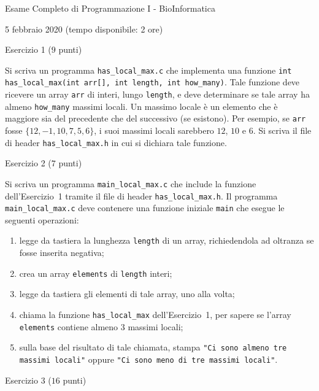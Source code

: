 \documentclass[12pt]{article}
\begin{document}
\begin{center}{\LARGE Esame Completo di Programmazione I - BioInformatica}\\
\vspace*{-2ex}
\begin{center}
  \large 5 febbraio 2020 (tempo disponibile: 2 ore)
\end{center}
\end{center}

\vspace*{1ex}
\begin{center}{\Large Esercizio 1} ($9$ punti)
\end{center}
Si scriva un programma \texttt{has\_local\_max.c} che implementa una funzione \texttt{int has\_local\_max(int arr[], int length, int how\_many)}. Tale funzione deve ricevere un array \texttt{arr} di interi, lungo \texttt{length}, e deve determinare se tale array ha almeno \texttt{how\_many} massimi locali. Un massimo locale \`e un elemento che \`e maggiore sia del precedente che del successivo (se esistono). Per esempio, se \texttt{arr} fosse $\{12,-1,10,7,5,6\}$, i suoi massimi locali sarebbero $12$, $10$ e $6$. Si scriva il file di header \texttt{has\_local\_max.h} in cui si dichiara tale funzione.

\vspace*{1ex}
\begin{center}{\Large Esercizio 2} ($7$ punti)\end{center}
%
Si scriva un programma \texttt{main\_local\_max.c} che include la funzione dell'Esercizio~1 tramite
il file di header \texttt{has\_local\_max.h}.
Il programma \texttt{main\_local\_max.c} deve contenere una funzione iniziale \texttt{main} che esegue
le seguenti operazioni:
\begin{enumerate}
\item legge da tastiera la lunghezza \texttt{length} di un array, richiedendola ad oltranza se fosse inserita negativa;
\item crea un array \texttt{elements} di \texttt{length} interi;
\item legge da tastiera gli elementi di tale array, uno alla volta;
\item chiama la funzione \texttt{has\_local\_max} dell'Esercizio~1, per sapere se l'array
  \texttt{elements} contiene almeno $3$ massimi locali;
\item sulla base del risultato di tale chiamata, stampa \texttt{"Ci sono almeno tre massimi locali"}
  oppure \texttt{"Ci sono meno di tre massimi locali"}.
\end{enumerate}

\vspace*{1ex}
\begin{center}{\Large Esercizio 3} ($16$ punti)\end{center}
\end{document}
